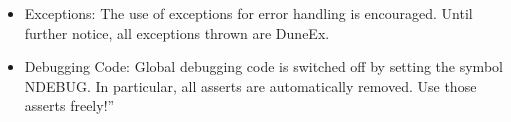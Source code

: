 \begin{itemize}
\begin{itemize}
\item Method Parameters
\item Template Parameters
\item Return Values
\item Exceptions thrown by a method
 \end{itemize}
     Since we all know that writing documentation is not well-liked and is frequently defered to some vague 
'next week', we herewith proclaim the Doc-Me Dogma . It goes like this: Whatever you do, and in whatever hurry you 
happen to be, please document everything at least with a {\verb /** $\backslash$todo Please doc me! */}. That way at least the absence 
of documentation is documented, and it is easier to get rid of it systematically.
\item Exceptions:
      The use of exceptions for error handling is encouraged. Until further notice, all exceptions thrown are DuneEx.
\item Debugging Code:
      Global debugging code is switched off by setting the symbol NDEBUG. In particular, all asserts are 
automatically removed. Use those asserts freely!''
\end{itemize}
